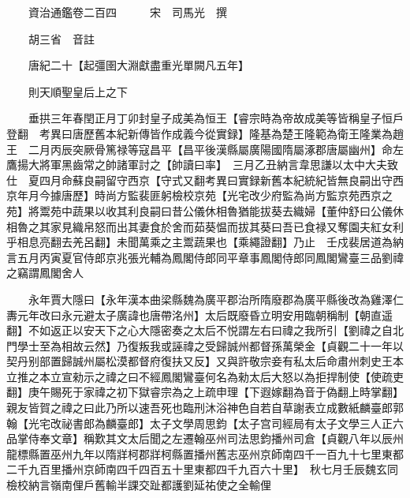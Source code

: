 










 


 
 


 

  
  
  
  
  





  
  
  
  
  
 
  

  

  
  
  



  

 
 

  
   




  

  
  


  　　資治通鑑卷二百四　　　宋　司馬光　撰

　　胡三省　音註

　　唐紀二十【起彊圉大淵獻盡重光單闕凡五年】

　　則天順聖皇后上之下

　　垂拱三年春閏正月丁卯封皇子成美為恒王【睿宗時為帝故成美等皆稱皇子恒戶登翻　考異曰唐歷舊本紀新傳皆作成義今從實録】隆基為楚王隆範為衛王隆業為趙王　二月丙辰突厥骨篤禄等寇昌平【昌平後漢縣屬廣陽國隋屬涿郡唐屬幽州】命左鷹揚大將軍黑齒常之帥諸軍討之【帥讀曰率】　三月乙丑納言韋思謙以太中大夫致仕　夏四月命蘇良嗣留守西京【守式又翻考異曰實録新舊本紀統紀皆無良嗣出守西京年月今據唐歷】時尚方監裴匪躬檢校京苑【光宅改少府監為尚方監京苑西京之苑】將鬻苑中蔬果以收其利良嗣曰昔公儀休相魯猶能拔葵去織婦【董仲舒曰公儀休相魯之其家見織帛怒而出其妻食於舍而茹葵愠而拔其葵曰吾已食禄又奪園夫紅女利乎相息亮翻去羌呂翻】未聞萬乘之主鬻蔬果也【乘繩證翻】乃止　壬戍裴居道為納言五月丙寅夏官侍郎京兆張光輔為鳳閣侍郎同平章事鳳閣侍郎同鳳閣鸞臺三品劉禕之竊謂鳳閣舍人

　　永年賈大隱曰【永年漢本曲梁縣魏為廣平郡治所隋廢郡為廣平縣後改為雞澤仁夀元年改曰永元避太子廣諱也唐帶洺州】太后既廢昏立明安用臨朝稱制【朝直遥翻】不如返正以安天下之心大隱密奏之太后不悦謂左右曰禕之我所引【劉禕之自北門學士至為相故云然】乃復叛我或誣禕之受歸誠州都督孫萬榮金【貞觀二十一年以契丹别部置歸誠州屬松漠都督府復扶又反】又與許敬宗妾有私太后命肅州刺史王本立推之本立宣勑示之禕之曰不經鳳閣鸞臺何名為勑太后大怒以為拒捍制使【使疏吏翻】庚午賜死于家禕之初下獄睿宗為之上疏申理【下遐嫁翻為音于偽翻上時掌翻】親友皆賀之禕之曰此乃所以速吾死也臨刑沐浴神色自若自草謝表立成數紙麟臺郎郭翰【光宅改祕書郎為麟臺郎】太子文學周思鈞【太子宫司經局有太子文學三人正六品掌侍奉文章】稱歎其文太后聞之左遷翰巫州司法思鈞播州司倉【貞觀八年以辰州龍標縣置巫州九年以隋牂柯郡牂柯縣置播州舊志巫州京師南四千一百九十七里東都二千九百里播州京師南四千四百五十里東都四千九百六十里】　秋七月壬辰魏玄同檢校納言嶺南俚戶舊輸半課交趾都護劉延祐使之全輸俚

